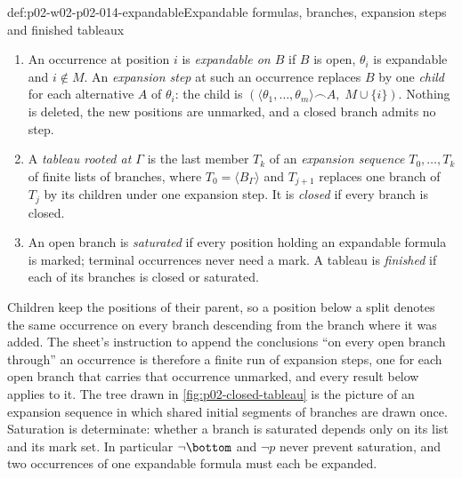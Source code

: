 \begin{hbdefinition}{def:p02-w02-p02-014-expandable}{Expandable formulas, branches, expansion steps and finished tableaux}
\begin{enumerate}
        \(\operatorname{fm}(B)=\{\theta_1,\ldots,\theta_m\}\).  The branch is \emph{closed} if
        \(\bottom\in\operatorname{fm}(B)\) or both \(\chi\in\operatorname{fm}(B)\) and \(\neg\chi\in\operatorname{fm}(B)\) for
        some \(\chi\), and \emph{open} otherwise.
  \item An occurrence at position \(i\) is \emph{expandable on \(B\)} if
        \(B\) is open, \(\theta_i\) is expandable and \(i\notin M\).  An
        \emph{expansion step} at such an occurrence replaces \(B\) by one
        \emph{child} for each alternative \(A\) of \(\theta_i\): the child is
        \((\langle\theta_1,\ldots,\theta_m\rangle\frown A,\;M\cup\{i\})\).
        Nothing is deleted, the new positions are unmarked, and a closed
        branch admits no step.
  \item A \emph{tableau rooted at \(\Gamma\)} is the last member \(T_k\) of an
        \emph{expansion sequence} \(T_0,\ldots,T_k\) of finite lists of
        branches, where \(T_0=\langle B_\Gamma\rangle\) and \(T_{j+1}\)
        replaces one branch of \(T_j\) by its children under one expansion
        step.  It is \emph{closed} if every branch is closed.
  \item An open branch is \emph{saturated} if every position holding an
        expandable formula is marked; terminal occurrences never need a mark.
        A tableau is \emph{finished} if each of its branches is closed or
        saturated.
\end{enumerate}
\end{hbdefinition}

Children keep the positions of their parent, so a position below a split
denotes the same occurrence on every branch descending from the branch where
it was added.  The sheet's instruction to append the conclusions ``on every
open branch through'' an occurrence is therefore a finite run of expansion
steps, one for each open branch that carries that occurrence unmarked, and
every result below applies to it.  The tree drawn in
\cref{fig:p02-closed-tableau} is the picture of an expansion sequence in
which shared initial segments of branches are drawn once.  Saturation is
determinate: whether a branch is saturated depends only on its list and its
mark set.  In particular \(\neg\bottom\) and \(\neg p\) never prevent
saturation, and two occurrences of one expandable formula must each be
expanded.

